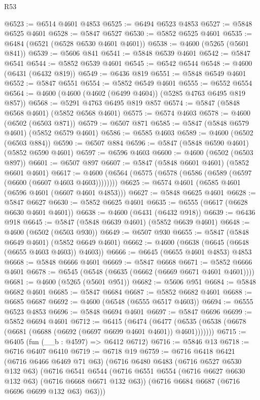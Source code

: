 \begin{lexlean}{R53}
\begin{coremodule}
@6523 := @6514 @4601 @4853
@6525 := @6494 @6523 @4853
@6527 := @5848 @6525 @4601
@6528 := @5847 @6527
@6530 := @5852 @6525 @4601
@6535 := @6484 (@6521 (@6528 @6530 @4601 @4601))
@6538 := @4600 (@5265 (@5601 @841))
@6539 := @5606 @841
@6541 := @5848 @6539 @4601
@6542 := @5847 @6541
@6544 := @5852 @6539 @4601
@6545 := @6542 @6544
@6548 := @4600 (@6431 (@6432 @819))
@6549 := @6436 @819
@6551 := @5848 @6549 @4601
@6552 := @5847 @6551
@6554 := @5852 @6549 @4601
@6555 := @6552 @6554
@6564 := @4600 (@4600 (@4602 (@6499 @4604)) (@5285 @4763 @6495 @819 @857))
@6568 := @5291 @4763 @6495 @819 @857
@6574 := @5847 (@5848 @6568 @4601) (@5852 @6568 @4601)
@6575 := @6574 @4603
@6578 := @4600 (@6502 (@6503 @871))
@6579 := @6507 @871
@6585 := @5847 (@5848 @6579 @4601) (@5852 @6579 @4601)
@6586 := @6585 @4603
@6589 := @4600 (@6502 (@6503 @884))
@6590 := @6507 @884
@6596 := @5847 (@5848 @6590 @4601) (@5852 @6590 @4601)
@6597 := @6596 @4603
@6600 := @4600 (@6502 (@6503 @897))
@6601 := @6507 @897
@6607 := @5847 (@5848 @6601 @4601) (@5852 @6601 @4601)
@6617 := @4600 (@6564 (@6575 (@6578 (@6586 (@6589 (@6597 (@6600 (@6607 @4603 @4603))))))))
@6625 := @6574 @4601 (@6585 @4601 (@6596 @4601 (@6607 @4601 @4853)))
@6627 := @5848 @6625 @4601
@6628 := @5847 @6627
@6630 := @5852 @6625 @4601
@6635 := @6555 (@6617 (@6628 @6630 @4601 @4601))
@6638 := @4600 (@6431 (@6432 @918))
@6639 := @6436 @918
@6645 := @5847 (@5848 @6639 @4601) (@5852 @6639 @4601)
@6648 := @4600 (@6502 (@6503 @930))
@6649 := @6507 @930
@6655 := @5847 (@5848 @6649 @4601) (@5852 @6649 @4601)
@6662 := @4600 (@6638 (@6645 (@6648 (@6655 @4603 @4603)) @4603))
@6666 := @6645 (@6655 @4601 @4853) @4853
@6668 := @5848 @6666 @4601
@6669 := @5847 @6668
@6671 := @5852 @6666 @4601
@6678 := @6545 (@6548 (@6635 (@6662 (@6669 @6671 @4601 @4601))))
@6681 := @4600 (@5265 (@5601 @951))
@6682 := @5606 @951
@6684 := @5848 @6682 @4601
@6685 := @5847 @6684
@6687 := @5852 @6682 @4601
@6688 := @6685 @6687
@6692 := @4600 (@6548 (@6555 @6517 @4603))
@6694 := @6555 @6523 @4853
@6696 := @5848 @6694 @4601
@6697 := @5847 @6696
@6699 := @5852 @6694 @4601
@6712 := @6415
    (@6474 (@6477 (@6535 (@6538 (@6678 (@6681 (@6688 (@6692 (@6697 @6699 @4601 @4601)) @4601)))))))
@6715 := @6405 (fun (__b : @4597) => @6412 @6712)
@6716 := @5846 @13
@6718 := @6716 @6407 @6410
@6719 := @6718 @19
@6759 := @6716
    @6418
    @6421
    (@6716 @6466 @6469 @71 @63)
    (@6716
      @6480
      @6483
      (@6716 @6527 @6530 @132 @63)
      (@6716
        @6541
        @6544
        (@6716 @6551 @6554 (@6716 @6627 @6630 @132 @63) (@6716 @6668 @6671 @132 @63))
        (@6716 @6684 @6687 (@6716 @6696 @6699 @132 @63) @63)))

\end{coremodule}
\end{lexlean}
